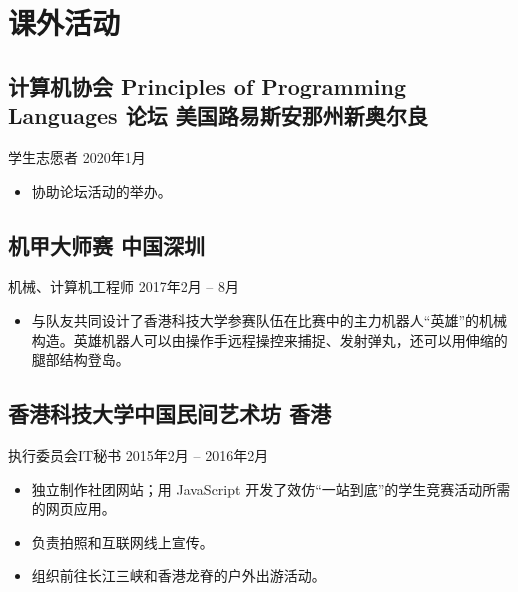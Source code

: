 \documentclass[
  10pt,           %
  autoindent=0pt, %
  scheme=plain,   %
]{ctexart}
\newcommand{\subsec}[2]{\subsection*{#1 \hfill {\normalfont #2}}}
\newcommand{\subsecdesc}[2]{{\kaishu #1 \hfill #2}}
\begin{document}
\section*{课外活动} %

  \subsec{计算机协会 Principles of Programming Languages 论坛}{美国路易斯安那州新奥尔良}
  \subsecdesc{学生志愿者}{2020年1月}
  \begin{itemize}
    \item 协助论坛活动的举办。
  \end{itemize}

  \subsec{机甲大师赛}{中国深圳}
  \subsecdesc{机械、计算机工程师}{2017年2月 -- 8月}
  \begin{itemize}
    \item 与队友共同设计了香港科技大学参赛队伍在比赛中的主力机器人“英雄”的机械构造。英雄机器人可以由操作手远程操控来捕捉、发射弹丸，还可以用伸缩的腿部结构登岛。
  \end{itemize}

  \subsec{香港科技大学中国民间艺术坊}{香港}
  \subsecdesc{执行委员会IT秘书}{2015年2月 -- 2016年2月}
  \begin{itemize}
    \item 独立制作社团网站；用 JavaScript 开发了效仿“一站到底”的学生竞赛活动所需的网页应用。
    \item 负责拍照和互联网线上宣传。
    \item 组织前往长江三峡和香港龙脊的户外出游活动。
  \end{itemize}
\end{document}
